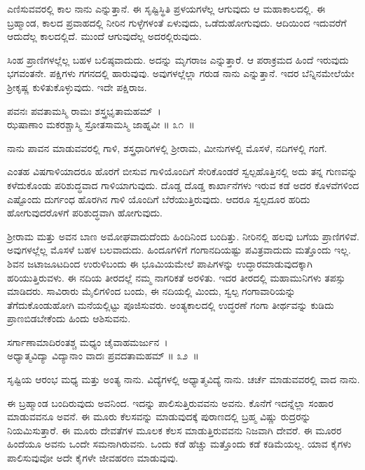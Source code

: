 \newpage

ಎಣಿಸುವವರಲ್ಲಿ ಕಾಲ ನಾನು ಎನ್ನುತ್ತಾನೆ. ಈ ಸೃಷ್ಟಿಸ್ಥಿತಿ ಪ್ರಳಯಗಳೆಲ್ಲ ಆಗುವುದು ಆ ಮಹಾಕಾಲದಲ್ಲಿ. ಈ ಬ್ರಹ್ಮಾಂಡ, ಕಾಲದ ಪ್ರವಾಹದಲ್ಲಿ ನೀರಿನ ಗುಳ್ಳೆಗಳಂತೆ ಏಳುವುದು, ಒಡೆದುಹೋಗುವುದು. ಆದಿಯಿಂದ ಇದುವರೆಗೆ ಆದುದೆಲ್ಲ ಕಾಲದಲ್ಲಿದೆ. ಮುಂದೆ ಆಗುವುದೆಲ್ಲ ಅದರಲ್ಲಿರುವುದು.

ಸಿಂಹ ಪ್ರಾಣಿಗಳಲ್ಲೆಲ್ಲ ಬಹಳ ಬಲಿಷ್ಠವಾದುದು. ಅದನ್ನು ಮೃಗರಾಜ ಎನ್ನುತ್ತಾರೆ. ಆ ಪರಾಕ್ರಮದ ಹಿಂದೆ ಇರುವುದು ಭಗವಂತನೇ. ಪಕ್ಷಿಗಳು ಗಗನದಲ್ಲಿ ಹಾರುವುವು. ಅವುಗಳಲ್ಲೆಲ್ಲಾ ಗರುಡ ನಾನು ಎನ್ನುತ್ತಾನೆ. ಇದರ ಬೆನ್ನಿನಮೇಲೆಯೇ ಶ‍್ರೀಕೃಷ್ಣ ಕುಳಿತುಕೊಳ್ಳುವುದು. ಇದೇ ಪಕ್ಷಿರಾಜ.

\begin{shloka}
ಪವನಃ ಪವತಾಮಸ್ಮಿ ರಾಮಃ ಶಸ್ತ್ರಭೃತಾಮಹಮ್~।\\ಝಷಾಣಾಂ ಮಕರಶ್ಚಾಸ್ಮಿ ಸ್ರೋತಸಾಮಸ್ಮಿ ಜಾಹ್ನವೀ \hfill॥ ೩೧~॥
\end{shloka}

\begin{artha}
ನಾನು ಪಾವನ ಮಾಡುವವರಲ್ಲಿ ಗಾಳಿ, ಶಸ್ತ್ರಧಾರಿಗಳಲ್ಲಿ ಶ‍್ರೀರಾಮ, ಮೀನುಗಳಲ್ಲಿ ಮೊಸಳೆ, ನದಿಗಳಲ್ಲಿ ಗಂಗೆ.
\end{artha}

ಎಂತಹ ವಿಷಗಾಳಿಯಾದರೂ ಹೊರಗೆ ಬೀಸುವ ಗಾಳಿಯೊಂದಿಗೆ ಸೇರಿಕೊಂಡರೆ ಸ್ವಲ್ಪಹೊತ್ತಿನಲ್ಲಿ ಅದು ತನ್ನ ಗುಣವನ್ನು ಕಳೆದುಕೊಂಡು ಪರಿಶುದ್ಧವಾದ ಗಾಳಿಯಾಗುವುದು. ದೊಡ್ಡ ದೊಡ್ಡ ಕಾರ್ಖಾನೆಗಳು ಇರುವ ಕಡೆ ಅದರ ಕೊಳವೆಗಳಿಂದ ಎಷ್ಟೊಂದು ದುರ್ಗಂಧ ಹೊರಗಿನ ಗಾಳಿ ಯೊಂದಿಗೆ ಬೆರೆಯುತ್ತಿರುವುದು. ಆದರೂ ಸ್ವಲ್ಪದೂರ ಹರಿದು ಹೋಗುವುದರೊಳಗೆ ಪರಿಶುದ್ಧವಾಗಿ ಹೋಗುವುದು.

ಶ‍್ರೀರಾಮ ಮತ್ತು ಅವನ ಬಾಣ ಅಮೋಘವಾದುದೆಂದು ಹಿಂದಿನಿಂದ ಬಂದಿತ್ತು. ನೀರಿನಲ್ಲಿ ಹಲವು ಬಗೆಯ ಪ್ರಾಣಿಗಳಿವೆ. ಅವುಗಳಲ್ಲೆಲ್ಲ ಮೊಸಳೆ ಬಹಳ ಬಲವಾದುದು. ಹಿಂದೂಗಳಿಗೆ ಗಂಗಾನದಿಯಷ್ಟು ಪವಿತ್ರವಾದುದು ಮತ್ತೊಂದು ಇಲ್ಲ. ಶಿವನ ಜಟಾಜೂಟದಿಂದ ಉರುಳಿಬಂದು ಈ ಭೂಮಿಯಮೇಲೆ ಪಾಪಿಗಳನ್ನು ಉದ್ಧಾರಮಾಡುವುದಕ್ಕಾಗಿ ಹರಿಯುತ್ತಿರು\-ವಳು. ಈ ನದಿಯ ತೀರದಲ್ಲೆ ನಮ್ಮ ನಾಗರಿಕತೆ ಅರಳಿತು. ಇದರ ತೀರದಲ್ಲಿ ಮಹಾಮುನಿಗಳು ತಪಸ್ಸು ಮಾಡಿದರು. ಸಾವಿರಾರು ಮೈಲಿಗಳಿಂದ ಬಂದು, ಈ ನದಿಯಲ್ಲಿ ಮಿಂದು, ಸ್ವಲ್ಪ ಗಂಗಾವಾರಿಯನ್ನು ತೆಗೆದುಕೊಂಡುಹೋಗಿ ಮನೆಯಲ್ಲಿಟ್ಟು ಪೂಜಿಸುವರು. ಅಂತ್ಯಕಾಲದಲ್ಲಿ ಉದ್ಧರಣೆ ಗಂಗಾ ತೀರ್ಥವನ್ನು ಕುಡಿದು ಪ್ರಾಣಬಿಡಬೇಕೆಂದು ಹಿಂದು ಆಶಿಸುವನು.

\begin{shloka}
ಸರ್ಗಾಣಾಮಾದಿರಂತಶ್ಚ ಮಧ್ಯಂ ಚೈವಾಹಮರ್ಜುನ~।\\ಅಧ್ಯಾತ್ಮವಿದ್ಯಾ ವಿದ್ಯಾನಾಂ ವಾದಃ ಪ್ರವದತಾಮಹಮ್ \hfill॥ ೩೨~॥
\end{shloka}

\begin{artha}
ಸೃಷ್ಟಿಯ ಆರಂಭ ಮಧ್ಯ ಮತ್ತು ಅಂತ್ಯ ನಾನು. ವಿದ್ಯೆಗಳಲ್ಲಿ ಅಧ್ಯಾತ್ಮವಿದ್ಯೆ ನಾನು. ಚರ್ಚೆ ಮಾಡುವವರಲ್ಲಿ ವಾದ ನಾನು.
\end{artha}

ಈ ಬ್ರಹ್ಮಾಂಡ ಬಂದಿರುವುದು ಅವನಿಂದ. ಇದನ್ನು ಪಾಲಿಸುತ್ತಿರುವವನು ಅವನು. ಕೊನೆಗೆ ಇದನ್ನೆಲ್ಲಾ ಸಂಹಾರ ಮಾಡುವವನೂ ಅವನೆ. ಈ ಮೂರು ಕೆಲಸವನ್ನು ಮಾಡುವುದಕ್ಕೆ ಪುರಾಣದಲ್ಲಿ ಬ್ರಹ್ಮ ವಿಷ್ಣು ರುದ್ರರನ್ನು ನಿಯಮಿಸುತ್ತಾರೆ. ಈ ಮೂರು ದೇವತೆಗಳ ಮೂಲಕ ಕೆಲಸ ಮಾಡುತ್ತಿರುವವನು ನಿಜವಾಗಿ ದೇವರೆ. ಈ ಮೂರರ ಹಿಂದೆಯೂ ಅವನು ಒಂದೇ ಸಮನಾಗಿರುವನು. ಒಂದು ಕಡೆ ಹೆಚ್ಚು ಮತ್ತೊಂದು ಕಡೆ ಕಡಿಮೆಯಲ್ಲ. ಯಾವ ಕೈಗಳು ಪಾಲಿಸುವುವೋ ಅದೇ ಕೈಗಳೇ ಜೀವಹರಣ ಮಾಡುವುವು.

